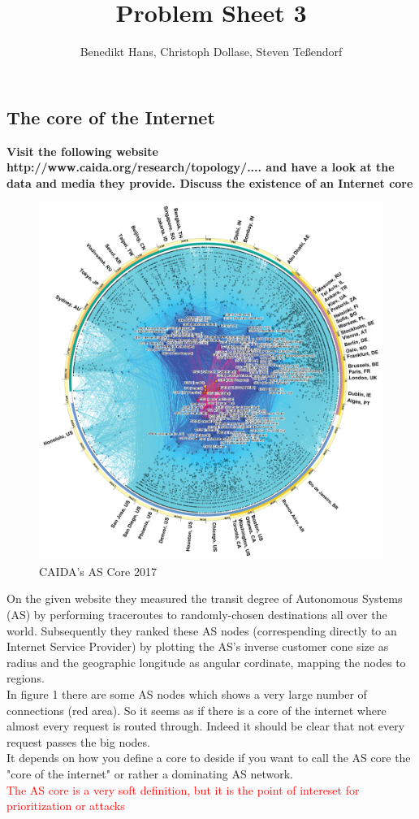 \documentclass[a4paper,12pt]{article}
\author{Benedikt Hans, Christoph Dollase, Steven Te\ss endorf}
\title{ \textbf{Problem Sheet 3}}
\begin{document}
	 
	\maketitle	 %
	
\subsection{The core of the Internet}
	\textbf{Visit the following website http://www.caida.org/research/topology/.... and have a look at the data and media they provide. Discuss the existence of an Internet core}\\

	\begin{figure}
		\includegraphics[width=0.8\linewidth]{ascore2017.png}
		\caption{CAIDA's AS Core 2017}
	\end{figure}
	On the given website they measured the transit degree of Autonomous Systems (AS) by performing traceroutes to randomly-chosen destinations all over the world.
	Subsequently they ranked these AS nodes (correspending directly to an Internet Service Provider) by plotting the AS's inverse customer cone size as radius and the geographic longitude as angular cordinate, mapping the nodes to regions.\\
	
	In figure 1 there are some AS nodes which shows a very large number of connections (red area). So it seems as if there is a core of the internet where almost every request is routed through.
	Indeed it should be clear that not every request passes the big nodes. \\
	It depends on how you define a core to deside if you want to call the AS core the "core of the internet" or rather a dominating AS network. 
	\\
	\textcolor{red}{The AS core is a very soft definition, but it is the point of intereset for prioritization or attacks}
	
\end{document}
